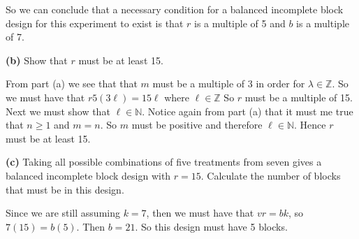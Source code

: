 \documentclass[12pt,]{article}
\begin{document}
So we can conclude that a necessary condition for a balanced incomplete
block design for this experiment to exist is that \(r\) is a multiple of
5 and \(b\) is a multiple of 7.

\textbf{(b)} Show that \(r\) must be at least 15.

From part (a) we see that that \(m\) must be a multiple of 3 in order
for \(\lambda \in \mathbb{Z}\). So we must have that
\(r5 (3\ell) = 15 \ell\) where \(\ell \in \mathbb{Z}\) So \(r\) must be
a multiple of 15. Next we must show that \(\ell \in \mathbb{N}\). Notice
again from part (a) that it must me true that \(n \geq1\) and \(m=n\).
So \(m\) must be positive and therefore \(\ell \in \mathbb{N}\). Hence
\(r\) must be at least 15.

\textbf{(c)} Taking all possible combinations of five treatments from
seven gives a balanced incomplete block design with \(r = 15\).
Calculate the number of blocks that must be in this design.

Since we are still assuming \(k=7\), then we must have that \(vr = bk\),
so \(7(15) = b (5)\). Then \(b=21\). So this design must have 5 blocks.
\end{document}
